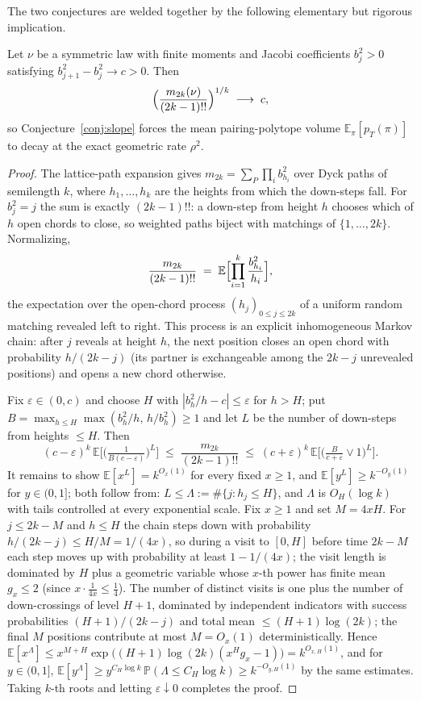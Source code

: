 The two conjectures are welded together by the following elementary but
rigorous implication.

\begin{proposition}\label{lem:dyck}
Let $\nu$ be a symmetric law with finite moments and Jacobi coefficients
$b_j^2>0$ satisfying $b_{j+1}^2-b_j^2\to c>0$.  Then
\[
\Bigl(\frac{m_{2k}(\nu)}{(2k-1)!!}\Bigr)^{1/k}\;\longrightarrow\;c ,
\]
so Conjecture~\ref{conj:slope} forces the mean pairing-polytope volume
$\mathbb E_\pi[p_T(\pi)]$ to decay at the exact geometric rate $\rho^2$.
\end{proposition}

\begin{proof}
The lattice-path expansion gives
$m_{2k}=\sum_{P}\prod_i b_{h_i}^2$ over Dyck paths of semilength $k$,
where $h_1,\dots,h_k$ are the heights from which the down-steps fall.
For $b_j^2=j$ the sum is exactly $(2k-1)!!$: a down-step from height $h$
chooses which of $h$ open chords to close, so weighted paths biject with
matchings of $\{1,\dots,2k\}$.  Normalizing,
\[
\frac{m_{2k}}{(2k-1)!!}\;=\;\mathbb E\Bigl[\prod_{i=1}^{k}
\frac{b^2_{h_i}}{h_i}\Bigr],
\]
the expectation over the open-chord process $(h_j)_{0\le j\le 2k}$ of a
uniform random matching revealed left to right.  This process is an
explicit inhomogeneous Markov chain: after $j$ reveals at height $h$,
the next position closes an open chord with probability $h/(2k-j)$ (its
partner is exchangeable among the $2k-j$ unrevealed positions) and opens
a new chord otherwise.

Fix $\varepsilon\in(0,c)$ and choose $H$ with
$|b_h^2/h-c|\le\varepsilon$ for $h>H$; put
$B=\max_{h\le H}\max(b_h^2/h,\,h/b_h^2)\ge1$ and let $L$ be the number
of down-steps from heights $\le H$.  Then
\[
(c-\varepsilon)^{k}\,\mathbb E\bigl[\bigl(\tfrac{1}{B(c-\varepsilon)}\bigr)^{L}\bigr]
\;\le\;\frac{m_{2k}}{(2k-1)!!}\;\le\;
(c+\varepsilon)^{k}\,\mathbb E\bigl[\bigl(\tfrac{B}{c+\varepsilon}\vee1\bigr)^{L}\bigr].
\]
It remains to show $\mathbb E[x^{L}]=k^{O_x(1)}$ for every fixed
$x\ge1$, and $\mathbb E[y^{L}]\ge k^{-O_y(1)}$ for $y\in(0,1]$; both
follow from: $L\le \Lambda:=\#\{j:h_j\le H\}$, and $\Lambda$ is
$O_{H}(\log k)$ with tails controlled at every exponential scale.  Fix
$x\ge1$ and set $M=4xH$.  For $j\le 2k-M$ and $h\le H$ the chain steps
down with probability $h/(2k-j)\le H/M=1/(4x)$, so during a visit to
$[0,H]$ before time $2k-M$ each step moves up with probability at least
$1-1/(4x)$; the visit length is dominated by $H$ plus a geometric
variable whose $x$-th power has finite mean $g_x\le2$ (since
$x\cdot\tfrac1{4x}\le\tfrac14$).  The number of distinct visits is one
plus the number of down-crossings of level $H{+}1$, dominated by
independent indicators with success probabilities $(H{+}1)/(2k-j)$ and
total mean $\le(H{+}1)\log(2k)$; the final $M$ positions contribute at
most $M=O_x(1)$ deterministically.  Hence
$\mathbb E[x^{\Lambda}]\le x^{M+H}
\exp\bigl((H{+}1)\log(2k)(x^{H}g_x-1)\bigr)=k^{O_{x,H}(1)}$, and for
$y\in(0,1]$, $\mathbb E[y^{\Lambda}]\ge
y^{C_H\log k}\,\mathbb P(\Lambda\le C_H\log k)\ge k^{-O_{y,H}(1)}$ by
the same estimates.  Taking $k$-th roots and letting
$\varepsilon\downarrow0$ completes the proof.
\end{proof}

